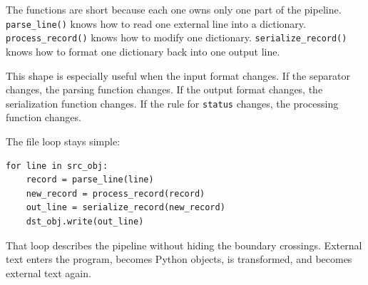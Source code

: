 The functions are short because each one owns only one part of the pipeline. \texttt{parse\_line()} knows how to read one external line into a dictionary. \texttt{process\_record()} knows how to modify one dictionary. \texttt{serialize\_record()} knows how to format one dictionary back into one output line.

This shape is especially useful when the input format changes. If the separator changes, the parsing function changes. If the output format changes, the serialization function changes. If the rule for \texttt{status} changes, the processing function changes.

The file loop stays simple:

\begin{verbatim}
for line in src_obj:
    record = parse_line(line)
    new_record = process_record(record)
    out_line = serialize_record(new_record)
    dst_obj.write(out_line)
\end{verbatim}

That loop describes the pipeline without hiding the boundary crossings. External text enters the program, becomes Python objects, is transformed, and becomes external text again.